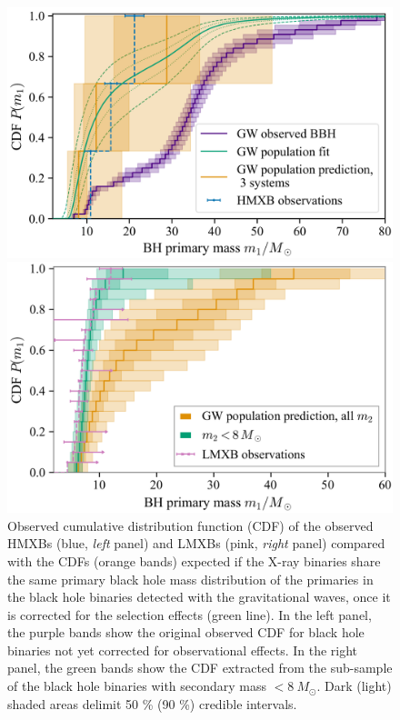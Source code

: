 \documentclass[a4paper,titlepage]{book}     	%
\newcommand{\sun}{\ensuremath{_\odot}}
\newcommand{\msun}{\ensuremath{M\sun}}
\begin{document}
\begin{figure}[h]
	\begin{minipage}{.49\textwidth}
		\centering
		\includegraphics[width=\textwidth]{./images/tensionHMXBHmass.png}
	\end{minipage}
	\hfill
	\begin{minipage}{.49\textwidth}
		\vspace{.5mm}
		\centering
		\includegraphics[width=\textwidth]{./images/tensionLMXBHmass.png}	
	\end{minipage}
	\caption{Observed cumulative distribution function (CDF) of the observed HMXBs (blue, \emph{left} panel) and LMXBs (pink, \emph{right} panel) compared with the CDFs (orange bands) expected if the X-ray binaries share the same primary black hole mass distribution of the primaries in the black hole binaries detected with the gravitational waves, once it is corrected for the selection effects (green line). In the left panel, the purple bands show the original observed CDF for black hole binaries not yet corrected for observational effects. In the right panel, the green bands show the CDF extracted from the sub-sample of the black hole binaries with secondary mass $< 8~\msun$. Dark (light) shaded areas delimit 50 \% (90 \%) credible intervals. \cite{HMXBH_spins2021}}\label{fig:tensionmass}
\end{figure}
\end{document}
